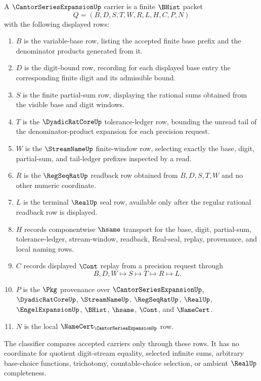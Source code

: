 \begin{definition}
\label{def:cantor-series-expansion-carrier}
A $\CantorSeriesExpansionUp$ carrier is a finite $\BHist$ packet
$$
Q=(B,D,S,T,W,R,L,H,C,P,N)
$$
with the following displayed rows:
\begin{enumerate}
\item $B$ is the variable-base row, listing the accepted finite base prefix and the denominator products generated from it.
\item $D$ is the digit-bound row, recording for each displayed base entry the corresponding finite digit and its admissible bound.
\item $S$ is the finite partial-sum row, displaying the rational sums obtained from the visible base and digit windows.
\item $T$ is the $\DyadicRatCoreUp$ tolerance-ledger row, bounding the unread tail of the denominator-product expansion for each precision request.
\item $W$ is the $\StreamNameUp$ finite-window row, selecting exactly the base, digit, partial-sum, and tail-ledger prefixes inspected by a read.
\item $R$ is the $\RegSeqRatUp$ readback row obtained from $B,D,S,T,W$ and no other numeric coordinate.
\item $L$ is the terminal $\RealUp$ seal row, available only after the regular rational readback row is displayed.
\item $H$ records componentwise $\hsame$ transport for the base, digit, partial-sum, tolerance-ledger, stream-window, readback, Real-seal, replay, provenance, and local naming rows.
\item $C$ records displayed $\Cont$ replay from a precision request through
$$
B,D,W \longmapsto S \longmapsto T \longmapsto R \longmapsto L .
$$
\item $P$ is the $\Pkg$ provenance over $\CantorSeriesExpansionUp$, $\DyadicRatCoreUp$, $\StreamNameUp$, $\RegSeqRatUp$, $\RealUp$, $\EngelExpansionUp$, $\BHist$, $\hsame$, $\Cont$, and $\NameCert$.
\item $N$ is the local $\NameCert_{\CantorSeriesExpansionUp}$ row.
\end{enumerate}
The classifier compares accepted carriers only through these rows. It has no coordinate for quotient digit-stream equality, selected infinite sums, arbitrary base-choice functions, trichotomy, countable-choice selection, or ambient $\RealUp$ completeness.
\end{definition}

